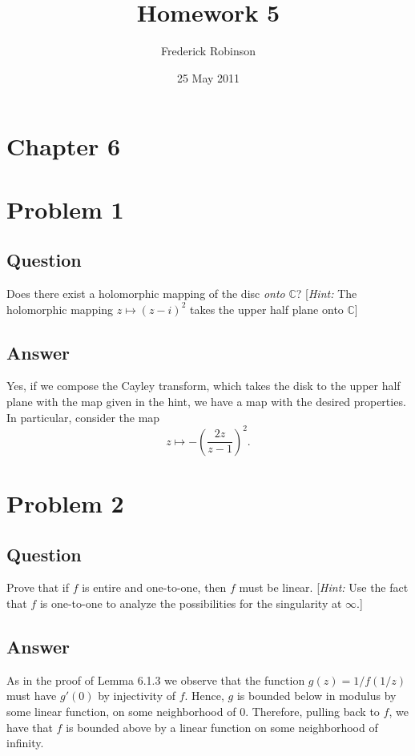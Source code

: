 \documentclass[11pt]{article}
\begin{document}



\title{Homework 5}
\author{Frederick Robinson}
\date{25 May 2011}
\maketitle


\section*{Chapter 6}

\section{Problem 1}
\subsection{Question}
Does there exist  a holomorphic mapping of the disc \emph{onto} $\mathbb{C}$? [\emph{Hint: } The holomorphic mapping $z \mapsto (z-i)^2$ takes the upper half plane onto $\mathbb{C}$]
\subsection{Answer}
Yes, if we compose the Cayley transform, which takes the disk to the upper half plane with the map given in the hint, we have a map with the desired properties. In particular, consider the map
\[z \mapsto -\left( \frac{2z}{z-1} \right)^2.\]


\section{Problem 2}
\subsection{Question}
Prove that if $f$ is entire and one-to-one, then $f$ must be linear. [\emph{Hint: } Use the fact that $f$ is one-to-one to analyze the possibilities for the singularity at $\infty$.]
\subsection{Answer}
As in the proof of Lemma 6.1.3 we observe that the function $g(z) = 1/f(1/z)$ must have $g'(0)$ by injectivity of $f$. Hence, $g$ is bounded below in modulus by some linear function, on some neighborhood of 0. Therefore, pulling back to $f$, we have that $f$ is bounded above by a linear function on some neighborhood of infinity.
\end{document}
